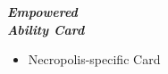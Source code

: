 \begin{multicols}{4}
  \begin{center}
    \begin{scriptsize}
    \end{scriptsize}
    \textbf{\textit{\textcolor{darkcandyapplered}{Empowered\\Ability Card}}}
  \end{center}
  \begin{itemize}
    \item[\textbf{4.}] Necropolis-specific Card
  \end{itemize}
  \vspace*{\fill}
\end{multicols}

